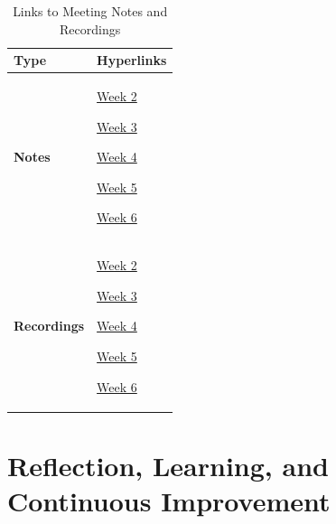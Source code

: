 \documentclass{article}
\begin{document}
\begin{xltabular}{8cm}{p{4cm} X}
    \caption{Links to Meeting Notes and Recordings}
    \label{tab:quick-links} \\
    \hline
    \textbf{Type} & \textbf{Hyperlinks} \\
    \hline
    \endfirsthead

    \hline
    \endlastfoot

    \textbf{Notes} & \href{https://docs.google.com/document/d/1xmWgrOT3ej_nIsrpDg2PSpWdRceK8fwI6DNl7It1qHE/edit?usp=sharing}{Week 2} \par \href{https://docs.google.com/document/d/1WdaFi9pqphsC86g0fr1Vazsp2pVx1C348ypmlM1nFhQ/edit?usp=sharing}{Week 3} \par \href{https://docs.google.com/document/d/1KpA3DNGGgSsxD16WQFf-JHx9Obc0zjWh5djjO1siQ70/edit?usp=sharing}{Week 4} \par \href{https://docs.google.com/document/d/1cOQNOdxrQEmlKtBGA0fAi28BBBrSdBdxoyCWRU_OD2s/edit?usp=sharing}{Week 5} \par \href{https://docs.google.com/document/d/15exNUMa88fH8xraCrFS4MbCKsYV2SY9AaO6yHp1tKsk/edit?usp=sharing}{Week 6} \\

    \hline

    \textbf{Recordings} & \href{https://liveswinburneeduau-my.sharepoint.com/:v:/g/personal/mmalam_swin_edu_au/IQA-vwAUCcfORKNHUEILTop7AYi5FJB4q9DqV2oNC07e3mc}{Week 2} \par \href{https://liveswinburneeduau-my.sharepoint.com/:v:/g/personal/mmalam_swin_edu_au/IQAQdV7vCtFsRZlFDRKLair5AQq96RTto9ptNtQ1EkszQQQ}{Week 3} \par \href{https://liveswinburneeduau-my.sharepoint.com/:v:/g/personal/mmalam_swin_edu_au/IQCjHg1VxAKjQaX10gQMdS9mAZ9juOZA04vp-M-fZ73Fgbc}{Week 4} \par \href{https://liveswinburneeduau-my.sharepoint.com/:v:/g/personal/mmalam_swin_edu_au/IQDj6eS1vwvfRaAoC6pNkwIJAXDrSPCZBAvRowFNn4i_6m0}{Week 5} \par \href{https://liveswinburneeduau-my.sharepoint.com/:v:/g/personal/mmalam_swin_edu_au/IQBJRG8SwuqaQLh0AmcRBmMoAXVvGyhvHIAniya6kSLihTo}{Week 6} \\
\end{xltabular}

\section{Reflection, Learning, and Continuous Improvement}
\end{document}
